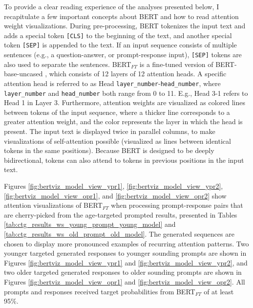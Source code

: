 To provide a clear reading experience of the analyses presented below, I recapitulate a few important concepts about BERT and how to read attention weight visualizations. During pre-processing, BERT tokenizes the input text and adds a special token \texttt{[CLS]} to the beginning of the text, and another special token \texttt{[SEP]} is appended to the text. If an input sequence consists of multiple sentences (e.g., a question-answer, or prompt-response input), \texttt{[SEP]} tokens are also used to separate the sentences. BERT$_{FT}$ is a fine-tuned version of BERT-base-uncased \citep{devlin-etal-2019-bert}, which consists of 12 layers of 12 attention heads. A specific attention head is referred to as Head \texttt{layer\_number}-\texttt{head\_number}, where \texttt{layer\_number} and \texttt{head\_number} both range from 0 to 11. E.g., Head 3-1 refers to Head 1 in Layer 3. Furthermore, attention weights are visualized as colored lines between tokens of the input sequence, where a thicker line corresponds to a greater attention weight, and the color represents the layer in which the head is present. The input text is displayed twice in parallel columns, to make visualizations of self-attention possible (visualized as lines between identical tokens in the same positions). Because BERT is designed to be deeply bidirectional, tokens can also attend to tokens in previous positions in the input text.

Figures \ref{fig:bertviz_model_view_ypr1}, \ref{fig:bertviz_model_view_ypr2}, \ref{fig:bertviz_model_view_opr1}, and \ref{fig:bertviz_model_view_opr2} show attention visualizations of BERT$_{FT}$ when processing prompt-response pairs that are cherry-picked from the age-targeted prompted results, presented in Tables \ref{tab:ctg_results_ws_young_prompt_young_model} and \ref{tab:ctg_results_ws_old_prompt_old_model}. The generated sequences are chosen to display more pronounced examples of recurring attention patterns. Two younger targeted generated responses to younger sounding prompts are shown in Figures \ref{fig:bertviz_model_view_ypr1} and \ref{fig:bertviz_model_view_ypr2}, and two older targeted generated responses to older sounding prompts are shown in Figures \ref{fig:bertviz_model_view_opr1} and \ref{fig:bertviz_model_view_opr2}. All prompts and responses received target probabilities from BERT$_{FT}$ of at least 95\%.

